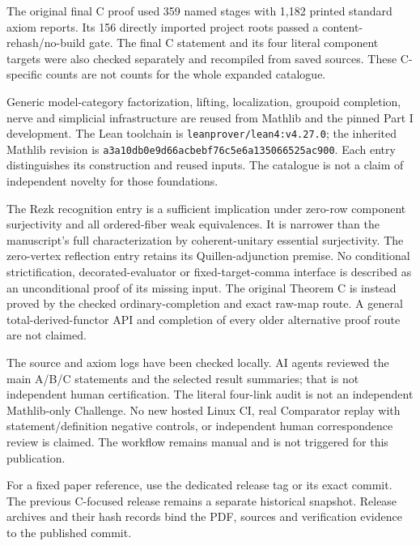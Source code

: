The original final C proof used 359 named stages with 1,182 printed standard
axiom reports.
Its 156 directly imported project roots passed a content-rehash/no-build gate.
The final C statement and its four literal component targets were also checked
separately and recompiled from saved sources.
These C-specific counts are not counts for the whole expanded catalogue.

Generic model-category factorization, lifting, localization, groupoid completion,
nerve and simplicial infrastructure are reused from Mathlib and the pinned
Part I development.
The Lean toolchain is \texttt{leanprover/lean4:v4.27.0};
the inherited Mathlib revision is
\nolinkurl{a3a10db0e9d66acbebf76c5e6a135066525ac900}.
Each entry distinguishes its construction and reused inputs.
The catalogue is not a claim of independent novelty for those foundations.

The Rezk recognition entry is a sufficient implication under zero-row component
surjectivity and all ordered-fiber weak equivalences.
It is narrower than the manuscript's full characterization by coherent-unitary
essential surjectivity.
The zero-vertex reflection entry retains its Quillen-adjunction premise.
No conditional strictification, decorated-evaluator or fixed-target-comma
interface is described as an unconditional proof of its missing input.
The original Theorem C is instead proved by the checked ordinary-completion
and exact raw-map route.
A general total-derived-functor API and completion of every older alternative
proof route are not claimed.

The source and axiom logs have been checked locally.
AI agents reviewed the main A/B/C statements and the selected result summaries;
that is not independent human certification.
The literal four-link audit is not an independent Mathlib-only Challenge.
No new hosted Linux CI, real Comparator replay with statement/definition
negative controls, or independent human correspondence review is claimed.
The workflow remains manual and is not triggered for this publication.

For a fixed paper reference, use the dedicated release tag
\texttt{\CompanionTag} or its exact commit.
The previous C-focused release remains a separate historical snapshot.
Release archives and their hash records bind the PDF, sources and verification
evidence to the published commit.
